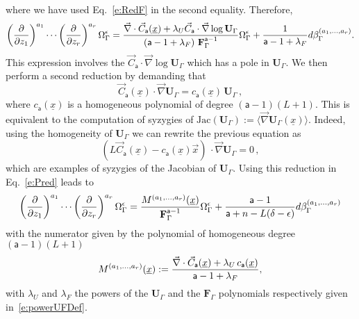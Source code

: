 \documentclass[a4paper,12pt]{article}
\numberwithin{equation}{section}
\numberwithin{figure}{section}
\begin{document}
where we have used Eq.~\eqref{e:RedF} in the second equality. Therefore, 
\begin{equation}
	\label{e:Pred}
\left(\partial\over \partial z_1\right)^{a_1}\cdots\left(\partial
  \over\partial z_r\right)^{a_r} \Omega_\Gamma^\epsilon={
\vec\nabla \cdot \vec C_{\mathsf{a}}
     (\underline x)
+ \lambda_U \vec
    C_{\mathsf{a}}\cdot\vec\nabla\log\mathbf{U}_\Gamma\over \left(\mathsf{a}-1+\lambda_F\right)\,\textbf{F}_\Gamma^{\mathsf{a}-1}}
  \Omega_\Gamma^\epsilon
+{  1\over \mathsf{a}-1+\lambda_F} d\beta_\Gamma^{(a_1,\dots,a_r)}.
\end{equation}
%
This expression involves the $\vec
    C_{\mathsf{a}}\cdot\vec\nabla\log\mathbf{U}_\Gamma$ which has a
    pole in $\mathbf{U}_\Gamma$. We then perform a second reduction by demanding that
    \begin{equation}
      \label{e:RedU}
      \vec
    C_{\mathsf{a}}(\underline x)\cdot\vec\nabla \mathbf{U}_\Gamma =
    c_{\mathsf{a}}(\underline x) \, \mathbf{U}_\Gamma \, ,
    \end{equation}
where $ c_{\mathsf{a}}(\underline x)$ is a homogeneous polynomial of
degree $(\mathsf{a}-1)(L+1)$. This is equivalent to the computation of
syzygies of $\text{Jac}( \mathbf
U_\Gamma):=\langle \vec\nabla \textbf{U}_\Gamma(\underline x)\rangle$. Indeed,  using the homogeneity of $\mathbf{U}_\Gamma$ we can rewrite the previous equation as 
\begin{equation}
 \left( L   \vec
C_{\mathsf{a}}(\underline x) -
c_{\mathsf{a}}(\underline x) \vec{x} \right) \, \cdot\vec\nabla
\mathbf{U}_\Gamma =0\, ,
\end{equation}
which are examples of syzygies of the Jacobian of $\mathbf U_\Gamma$. Using this reduction in Eq.~\eqref{e:Pred} leads to
% 
\begin{equation}\label{e:RedFinal}
\left(\partial\over \partial z_1\right)^{a_1}\cdots\left(\partial
  \over\partial z_r\right)^{a_r} \Omega_\Gamma^\epsilon={
M^{(a_1,\dots,a_r)}
     (\underline x)
\over \textbf{F}_\Gamma^{\mathsf{a}-1}}\Omega_\Gamma^\epsilon
+{  \mathsf{a}-1\over \mathsf{a}+n-L(\delta-\epsilon)} d\beta_\Gamma^{(a_1,\dots,a_r)}
\end{equation}
with the numerator given by the polynomial of homogeneous degree $(\mathsf{a}-1)(L+1)$
\begin{equation}
  \label{e:Mdimregfinal}
  M^{(a_1,\dots,a_r)}(\underline x):={\vec\nabla \cdot \vec C_{\mathsf{a}}
     (\underline x)
+ \lambda_U\, 
    c_{\mathsf{a}}(\underline x)\over \mathsf{a}-1+\lambda_F },
\end{equation}
with $\lambda_U$ and $\lambda_F$ the powers of the $\textbf{U}_\Gamma$
and the $\textbf{F}_\Gamma$ polynomials respectively given in~\eqref{e:powerUFDef}.
%
\end{document}
